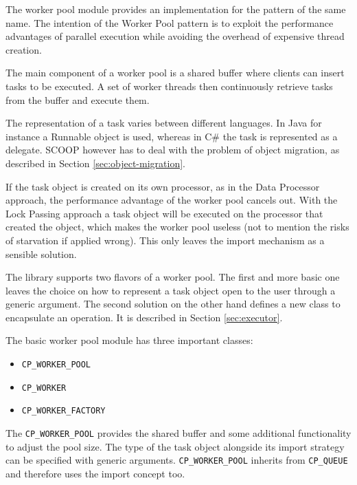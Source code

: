 The worker pool module provides an implementation for the pattern of the same name.
The intention of the Worker Pool pattern  is to exploit the performance advantages of parallel execution while avoiding the overhead of expensive thread creation.

The main component of a worker pool is a shared buffer where clients can insert tasks to be executed.
A set of worker threads then continuously retrieve tasks from the buffer and execute them.

The representation of a task varies between different languages.
In Java for instance a Runnable object is used, whereas in C\# the task is represented as a delegate.
SCOOP however has to deal with the problem of object migration, as described in Section \ref{sec:object-migration}.

If the task object is created on its own processor, as in the Data Processor approach, the performance advantage of the worker pool cancels out.
With the Lock Passing approach a task object will be executed on the processor that created the object, which makes the worker pool useless (not to mention the risks of starvation if applied wrong).
This only leaves the import mechanism as a sensible solution.

The library supports two flavors of a worker pool.
The first and more basic one leaves the choice on how to represent a task object open to the user through a generic argument.
The second solution on the other hand defines a new class to encapsulate an operation.
It is described in Section \ref{sec:executor}.

The basic worker pool module has three important classes:
\begin{itemize}
 \item \lstinline!CP_WORKER_POOL!
 \item \lstinline!CP_WORKER!
 \item \lstinline!CP_WORKER_FACTORY!
\end{itemize}

The \lstinline!CP_WORKER_POOL! provides the shared buffer and some additional functionality to adjust the pool size.
The type of the task object alongside its import strategy can be specified with generic arguments.
\lstinline!CP_WORKER_POOL! inherits from \lstinline!CP_QUEUE! and therefore uses the import concept too.

